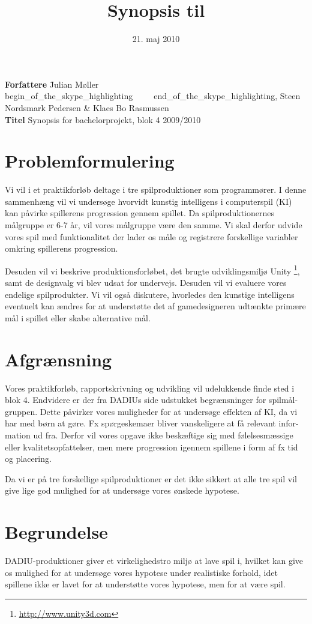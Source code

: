 \documentclass[10pt,a4paper,danish]{article}
\title{Synopsis til \thetitle}
\date{21. maj 2010}
\author{\theauthors}
\newcommand{\thetitle}{Synopsis for bachelorprojekt, blok 4 2009/2010}
\newcommand{\theauthors}{Julian Møller begin_of_the_skype_highlighting     end_of_the_skype_highlighting, Steen Nordsmark Pedersen \& Klaes Bo Rasmussen}
\begin{document}
\begin{tabbing}
\textbf{Forfattere} \= \theauthors \\
\textbf{Titel} \> \thetitle
\end{tabbing}

\section{Problemformulering}
\label{sec:Problemformulering}
Vi vil i et praktikforløb deltage i tre spilproduktioner som programmører. I
denne sammenhæng vil vi undersøge hvorvidt kunstig intelligens i computerspil
(KI) kan påvirke spillerens progression gennem spillet. Da spilproduktionernes
målgruppe er 6-7 år, vil vores målgruppe være den samme. Vi skal derfor udvide
vores spil med funktionalitet der lader os måle og registrere forskellige
variabler omkring spillerens progression.

Desuden vil vi beskrive produktionsforløbet, det brugte udviklingsmiljø Unity
\footnote{\url{http://www.unity3d.com}}, samt de designvalg vi blev udsat for
undervejs. Desuden vil vi evaluere vores endelige spilprodukter. Vi vil også
diskutere, hvorledes den kunstige intelligens eventuelt kan ændres for at
understøtte det af gamedesigneren udtænkte primære mål i spillet eller skabe
alternative mål.

\section{Afgrænsning}
\label{sec:Afgraensning}
Vores praktikforløb, rapportskrivning og udvikling vil udelukkende finde sted
i blok 4. Endvidere er der fra DADIUs side udstukket begrænsninger for spilmål-
gruppen. Dette påvirker vores muligheder for at undersøge effekten af KI, da vi har
med børn at gøre. Fx spørgeskemaer bliver vanskeligere at få relevant infor-
mation ud fra. Derfor vil vores opgave ikke beskæftige sig med
følelsesmæssige eller kvalitetsopfattelser, men mere progression igennem
spillene i form af fx tid og placering.

Da vi er på tre forskellige spilproduktioner er det ikke sikkert at alle tre
spil vil give lige god mulighed for at undersøge vores ønskede hypotese.

\section{Begrundelse}
\label{sec:Begrundelse}
DADIU-produktioner giver et virkelighedstro miljø at lave spil i, hvilket kan
give os mulighed for at undersøge vores hypotese under realistiske forhold,
idet spillene ikke er lavet for at understøtte vores hypotese, men for at være
spil.
\end{document}
